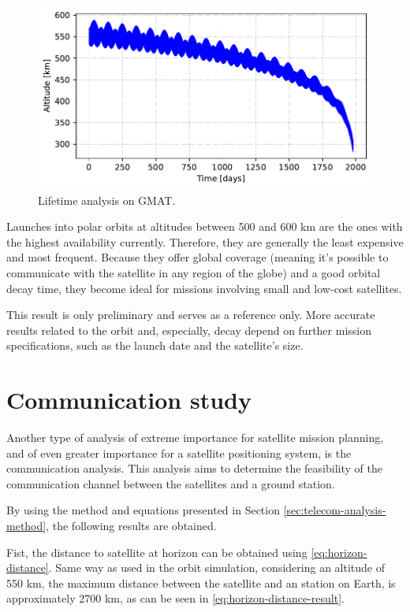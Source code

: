 \begin{figure}[!ht]
    \begin{center}
        \includegraphics[width=\columnwidth]{curves/lifetime.pdf}
        \caption{Lifetime analysis on GMAT.}
        \label{fig:lifetime-analysis}
    \end{center}
\end{figure}

Launches into polar orbits at altitudes between 500 and 600 km are the ones with the highest availability currently. Therefore, they are generally the least expensive and most frequent. Because they offer global coverage (meaning it's possible to communicate with the satellite in any region of the globe) and a good orbital decay time, they become ideal for missions involving small and low-cost satellites.

This result is only preliminary and serves as a reference only. More accurate results related to the orbit and, especially, decay depend on further mission specifications, such as the launch date and the satellite's size.

\section{Communication study}

Another type of analysis of extreme importance for satellite mission planning, and of even greater importance for a satellite positioning system, is the communication analysis. This analysis aims to determine the feasibility of the communication channel between the satellites and a ground station.

By using the method and equations presented in Section \ref{sec:telecom-analysis-method}, the following results are obtained.

Fist, the distance to satellite at horizon can be obtained using \autoref{eq:horizon-distance}. Same way as used in the orbit simulation, considering an altitude of 550 km, the maximum distance between the satellite and an station on Earth, is approximately 2700 km, as can be seen in \autoref{eq:horizon-distance-result}.

